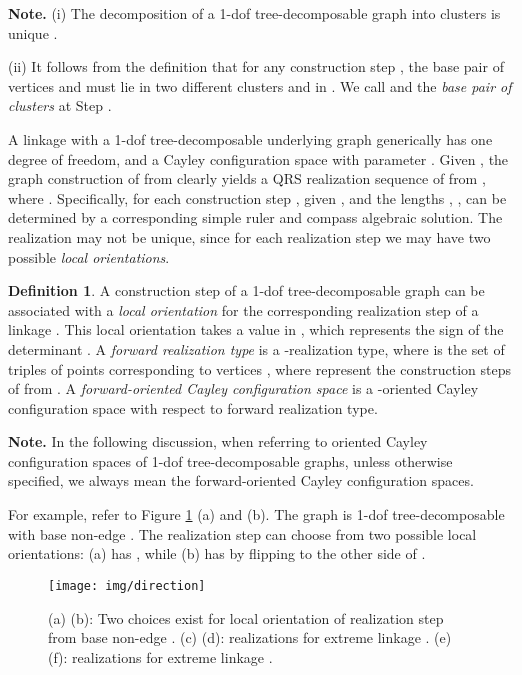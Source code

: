 \documentclass[secthm,amsthm,english]{article}
\theoremstyle{definition}
\newtheorem{definition}{Definition}
\theoremstyle{remark}
\begin{document}
\noindent\textbf{Note.} (i) The decomposition of a 1-dof tree-decomposable graph  into clusters is unique \cite{bib:FudHo97proof}. 

\noindent (ii) It follows from the definition that for any construction step , 
the base pair of vertices  and  must lie in two different clusters  and  in . 
We call  and  the \emph{base pair of clusters} at Step .

\smallskip





A linkage  with a 1-dof tree-decomposable underlying graph  generically has one degree of freedom,
and a  Cayley configuration space with parameter .
Given , the graph construction of  from  clearly yields a QRS realization sequence of  from , where . 
Specifically, for each construction step ,
given  ,  and the lengths , ,
 can be determined by a corresponding simple ruler and compass algebraic solution. 
The realization may not be unique, since for each realization step we may have two possible \emph{local orientations}.

\begin{definition} \label{def:solution-type}
A construction step   of a 1-dof tree-decomposable graph 
can be associated with a {\emph{local orientation}} for the corresponding realization step of a linkage .
This local orientation  takes a value in , 
which represents the sign of the determinant . 
A {\emph{forward realization type}} is a -realization type, 
where  is the set of triples of points corresponding to vertices , 
where  represent the construction steps of  from .
A {\emph{forward-oriented Cayley configuration space}} is a -oriented Cayley configuration space with respect to forward realization type. 
\end{definition}

\noindent\textbf{Note.}
In the following discussion, 
when referring to oriented Cayley configuration spaces of 1-dof tree-decomposable graphs,
unless otherwise specified, 
we always mean the forward-oriented Cayley configuration spaces. 
\smallskip

For example, refer to Figure \ref{F:direction} (a) and (b). The graph
is 1-dof tree-decomposable with base non-edge . The realization
step  can choose from two possible local orientations:
(a) has , while (b) has  by flipping  to the other side of . 

\begin{figure}[h]
	  
	  
	
	\begin{centering}
	\texttt{[image: img/direction]}
	\par\end{centering}
	
	\caption{ (a) (b): Two choices exist for local orientation of
	realization step  from base non-edge . 
	(c) (d): realizations for extreme linkage . 
	(e) (f): realizations for extreme linkage .}
	
	
	\label{F:direction} 
\end{figure}
\end{document}
